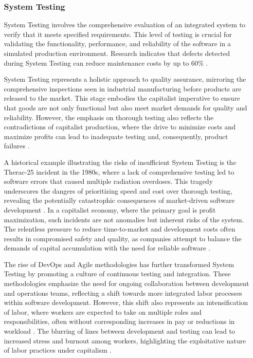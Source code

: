 \begin{refsection}
\subsubsection{System Testing}

System Testing involves the comprehensive evaluation of an integrated system to verify that it meets specified requirements. This level of testing is crucial for validating the functionality, performance, and reliability of the software in a simulated production environment. Research indicates that defects detected during System Testing can reduce maintenance costs by up to 60\% \cite[pp.~35-39]{kaner1999testing}.

System Testing represents a holistic approach to quality assurance, mirroring the comprehensive inspections seen in industrial manufacturing before products are released to the market. This stage embodies the capitalist imperative to ensure that goods are not only functional but also meet market demands for quality and reliability. However, the emphasis on thorough testing also reflects the contradictions of capitalist production, where the drive to minimize costs and maximize profits can lead to inadequate testing and, consequently, product failures \cite[pp.~230-235]{marx2008capital}.

A historical example illustrating the risks of insufficient System Testing is the Therac-25 incident in the 1980s, where a lack of comprehensive testing led to software errors that caused multiple radiation overdoses. This tragedy underscores the dangers of prioritizing speed and cost over thorough testing, revealing the potentially catastrophic consequences of market-driven software development \cite[pp.~155-160]{leveson1995safeware}. In a capitalist economy, where the primary goal is profit maximization, such incidents are not anomalies but inherent risks of the system. The relentless pressure to reduce time-to-market and development costs often results in compromised safety and quality, as companies attempt to balance the demands of capital accumulation with the need for reliable software \cite[pp.~147-151]{braverman1974labor}.

The rise of DevOps and Agile methodologies has further transformed System Testing by promoting a culture of continuous testing and integration. These methodologies emphasize the need for ongoing collaboration between development and operations teams, reflecting a shift towards more integrated labor processes within software development. However, this shift also represents an intensification of labor, where workers are expected to take on multiple roles and responsibilities, often without corresponding increases in pay or reductions in workload \cite[pp.~67-72]{fuchs2014digital}. The blurring of lines between development and testing can lead to increased stress and burnout among workers, highlighting the exploitative nature of labor practices under capitalism \cite[pp.~85-89]{huws2014labor}.


\end{refsection}
